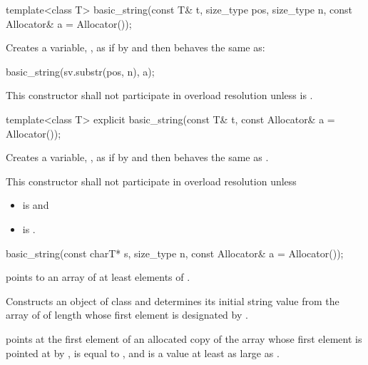 %
\begin{itemdecl}
template<class T>
  basic_string(const T& t, size_type pos, size_type n, const Allocator& a = Allocator());
\end{itemdecl}

\begin{itemdescr}
\pnum
\effects Creates a variable, ,
as if by 
and then behaves the same as:
\begin{codeblock}
basic_string(sv.substr(pos, n), a);
\end{codeblock}

\pnum
\remarks This constructor shall not participate in overload resolution
unless 
is .
\end{itemdescr}

%
\begin{itemdecl}
template<class T>
  explicit basic_string(const T& t, const Allocator& a = Allocator());
\end{itemdecl}

\begin{itemdescr}
\pnum
\effects Creates a variable, , as if by
 and
then behaves the same as .

\pnum
\remarks This constructor shall not participate in overload resolution unless
\begin{itemize}
\item {} is  and
\item {} is .
\end{itemize}
\end{itemdescr}

%
\begin{itemdecl}
basic_string(const charT* s, size_type n, const Allocator& a = Allocator());
\end{itemdecl}

\begin{itemdescr}
\pnum
\requires
{} points to an array of at least  elements of .

\pnum
\effects
Constructs an object of class 
and determines its initial string value from the array of
 of length  whose first element is designated by .

\pnum
\postconditions
{} points at the first element of an allocated copy
of the array whose first element is pointed at by ,
 is equal to , and  is
a value at least as large as .
\end{itemdescr}

